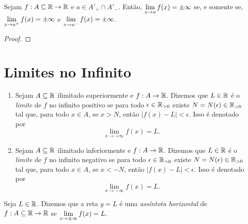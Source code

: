 \begin{theorem}
    Sejam $f : A \subseteq \mathbb{R} \to \mathbb{R}$ e $a \in A'_+ \cap A'_-$. Então, $\displaystyle \lim_{x \to a} f(x) = \pm \infty$ se, e somente se, $\displaystyle \lim_{x \to a^+} f(x) = \pm \infty$ e $\displaystyle \lim_{x \to a^-} f(x) = \pm \infty$.
\end{theorem}

\begin{proof}
    \blackproof
\end{proof}

\section{Limites no Infinito}

\begin{definition}
    \leavevmode
        \begin{enumerate}[leftmargin=*, align=left, label=\textbf{(\alph*)}]
            \item Sejam $A \subseteq \mathbb{R}$ ilimitado superiormente e $f : A \to \mathbb{R}$. Dizemos que $L \in \mathbb{R}$ é o \emph{limite} de $f$ no infinito positivo se para todo $\epsilon \in \mathbb{R}_{>0}$ existe $N = N(\epsilon) \in \mathbb{R}_{>0}$ tal que, para todo $x \in A$, se $x>N$, então $|f(x) - L| < \epsilon$. Isso é denotado por
                \[
                    \lim_{x \to +\infty} f(x) = L.
                \]
            \item Sejam $A \subseteq \mathbb{R}$ ilimitado inferiormente e $f : A \to \mathbb{R}$. Dizemos que $L \in \mathbb{R}$ é o \emph{limite} de $f$ no infinito negativo se para todo $\epsilon \in \mathbb{R}_{>0}$ existe $N = N(\epsilon) \in \mathbb{R}_{>0}$ tal que, para todo $x \in A$, se $x<-N$, então $|f(x) - L| < \epsilon$. Isso é denotado por
                \[
                    \lim_{x \to -\infty} f(x) = L.
                \]
        \end{enumerate}
\end{definition}

\begin{definition}
    Seja $L \in \mathbb{R}$. Dizemos que a reta $y = L$ é uma \emph{assíntota horizontal} de $f : A \subseteq \mathbb{R} \to \mathbb{R}$ se $\displaystyle \lim_{x \to \pm \infty} f(x) = L$.
\end{definition}

